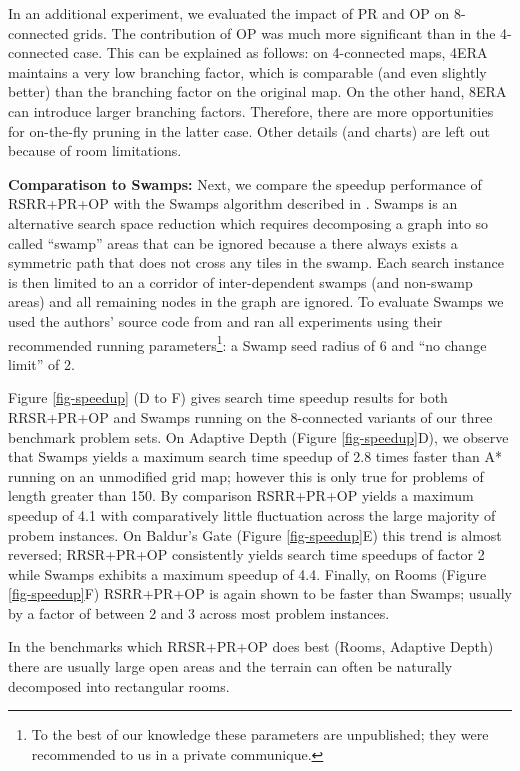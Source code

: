 In an additional experiment, we evaluated the impact of PR and OP on 8-connected grids.
The contribution of OP was much more significant than in the 4-connected case.
This can be explained as follows: on 4-connected maps, 4ERA maintains a very low
branching factor, which is comparable (and even slightly better) than the branching
factor on the original map. On the other hand, 8ERA can introduce larger branching factors.
Therefore, there are more opportunities for on-the-fly pruning in the latter case.
Other details (and charts) are left out because of room limitations.
\par
\textbf{Comparatison to Swamps:}
Next, we compare the speedup performance of RSRR+PR+OP with the Swamps algorithm 
described in \cite{pochter10}. Swamps is an alternative search space reduction 
which requires decomposing a graph into so called ``swamp'' areas that can be 
ignored because a there always exists a symmetric path that does not cross any 
tiles in the swamp. 
Each search instance is then limited to an a corridor of inter-dependent 
swamps (and non-swamp areas) and all remaining nodes in the graph are ignored.
To evaluate Swamps we used the authors' source code from \cite{pochter10} and
ran all experiments using their recommended running parameters\footnote{To the best of our knowledge 
these parameters are unpublished; they were recommended to us in a private communique.}:
 a Swamp seed radius of 6 and ``no change limit'' of 2.
\par
Figure \ref{fig-speedup} (D to F) gives search time speedup results for both 
RRSR+PR+OP and Swamps running on the 8-connected variants of our three benchmark 
problem sets. 
On Adaptive Depth (Figure \ref{fig-speedup}D), we observe that 
Swamps yields a maximum search time speedup of 2.8 times faster than 
 A* running on an unmodified grid map; however this is only true for problems of length greater than 150.
By comparison RSRR+PR+OP yields a maximum speedup of 4.1 with comparatively little fluctuation across the
large majority of probem instances.
On Baldur's Gate (Figure \ref{fig-speedup}E) this trend is almost reversed; RRSR+PR+OP consistently 
yields search time speedups of factor 2 while Swamps exhibits a maximum speedup of 4.4.
Finally, on Rooms (Figure \ref{fig-speedup}F) RSRR+PR+OP is again shown to be faster than Swamps;
usually by a factor of between 2 and 3 across most problem instances.
\par
In the benchmarks which RRSR+PR+OP does best (Rooms, Adaptive Depth) 
there are usually large open areas and the terrain can often be naturally decomposed into rectangular rooms.
